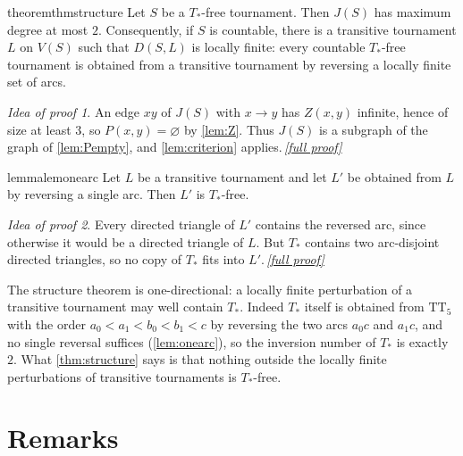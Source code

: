 \documentclass[11pt,a4paper]{article}
\theoremstyle{plain}
\theoremstyle{definition}
\theoremstyle{remark}
\newtheorem*{proofidea}{Idea of proof}
\newcommand{\fullproofref}[1]{\,\hyperref[#1]{\textit{[full proof]}}}
\newcommand{\Tstar}{T_{\ast}}
\newcommand{\TT}{\mathrm{TT}}
\begin{document}
\begin{restatable}{theorem}{thmstructure}\label{thm:structure}
Let $S$ be a $\Tstar$-free tournament. Then $J(S)$ has maximum degree at most $2$. Consequently, if $S$ is countable, there is a transitive tournament $L$ on $V(S)$ such that $D(S,L)$ is locally finite: every countable $\Tstar$-free tournament is obtained from a transitive tournament by reversing a locally finite set of arcs.
\end{restatable}
\begin{proofidea}
An edge $xy$ of $J(S)$ with $x\to y$ has $Z(x,y)$ infinite, hence of size at least $3$, so $P(x,y)=\varnothing$ by \cref{lem:Z}. Thus $J(S)$ is a subgraph of the graph of \cref{lem:Pempty}, and \cref{lem:criterion} applies.\fullproofref{pf:structure}
\end{proofidea}

\begin{restatable}{lemma}{lemonearc}\label{lem:onearc}
Let $L$ be a transitive tournament and let $L'$ be obtained from $L$ by reversing a single arc. Then $L'$ is $\Tstar$-free.
\end{restatable}
\begin{proofidea}
Every directed triangle of $L'$ contains the reversed arc, since otherwise it would be a directed triangle of $L$. But $\Tstar$ contains two arc-disjoint directed triangles, so no copy of $\Tstar$ fits into $L'$.\fullproofref{pf:onearc}
\end{proofidea}

The structure theorem is one-directional: a locally finite perturbation of a transitive tournament may well contain $\Tstar$. Indeed $\Tstar$ itself is obtained from $\TT_5$ with the order $a_0<a_1<b_0<b_1<c$ by reversing the two arcs $a_0c$ and $a_1c$, and no single reversal suffices (\cref{lem:onearc}), so the inversion number of $\Tstar$ is exactly $2$. What \cref{thm:structure} says is that nothing outside the locally finite perturbations of transitive tournaments is $\Tstar$-free.

\section{Remarks}
\end{document}
